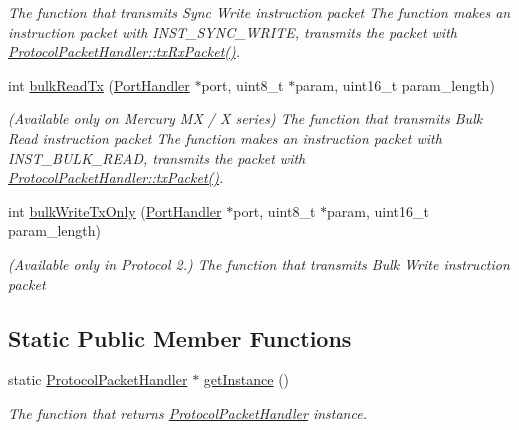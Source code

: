 \begin{DoxyCompactItemize}
\begin{DoxyCompactList}\small\item\em The function that transmits Sync Write instruction packet  The function makes an instruction packet with I\+N\+S\+T\+\_\+\+S\+Y\+N\+C\+\_\+\+W\+R\+I\+TE,  transmits the packet with \hyperlink{classmercury_1_1_protocol_packet_handler_a68b02f23af616886d0795ea12debd613}{Protocol\+Packet\+Handler\+::tx\+Rx\+Packet()}. \end{DoxyCompactList}\item 
int \hyperlink{classmercury_1_1_protocol_packet_handler_a81f298b0d67e9c578a3b2b839f90b378}{bulk\+Read\+Tx} (\hyperlink{classmercury_1_1_port_handler}{Port\+Handler} $\ast$port, uint8\+\_\+t $\ast$param, uint16\+\_\+t param\+\_\+length)
\begin{DoxyCompactList}\small\item\em (Available only on Mercury MX / X series) The function that transmits Bulk Read instruction packet  The function makes an instruction packet with I\+N\+S\+T\+\_\+\+B\+U\+L\+K\+\_\+\+R\+E\+AD,  transmits the packet with \hyperlink{classmercury_1_1_protocol_packet_handler_a245f01395d9684bc58788e8a06de3ffc}{Protocol\+Packet\+Handler\+::tx\+Packet()}. \end{DoxyCompactList}\item 
int \hyperlink{classmercury_1_1_protocol_packet_handler_ac6c15829fd1bd0e321a1d63076e11839}{bulk\+Write\+Tx\+Only} (\hyperlink{classmercury_1_1_port_handler}{Port\+Handler} $\ast$port, uint8\+\_\+t $\ast$param, uint16\+\_\+t param\+\_\+length)
\begin{DoxyCompactList}\small\item\em (Available only in Protocol 2.) The function that transmits Bulk Write instruction packet \end{DoxyCompactList}\end{DoxyCompactItemize}
\subsection*{Static Public Member Functions}
\begin{DoxyCompactItemize}
\item 
static \hyperlink{classmercury_1_1_protocol_packet_handler}{Protocol\+Packet\+Handler} $\ast$ \hyperlink{classmercury_1_1_protocol_packet_handler_a0de2b506e22d7673b1e5c83ddc507a74}{get\+Instance} ()
\begin{DoxyCompactList}\small\item\em The function that returns \hyperlink{classmercury_1_1_protocol_packet_handler}{Protocol\+Packet\+Handler} instance. \end{DoxyCompactList}\end{DoxyCompactItemize}


